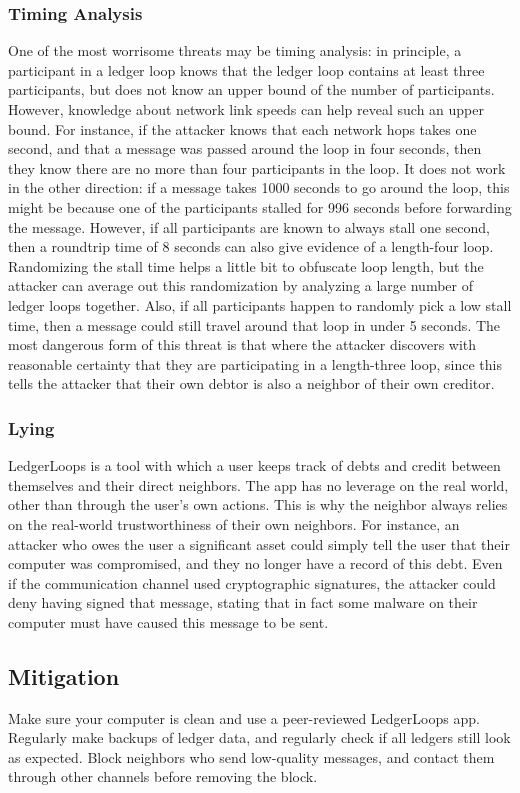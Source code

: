 \documentclass[11pt,twoside,a4paper]{article}
\begin{document}
\subsubsection{Timing Analysis}
One of the most worrisome threats may be timing analysis: in principle, a participant in a ledger loop knows that the ledger loop contains at least three participants, but does not know an upper bound of the number of participants. However, knowledge about network link speeds can help reveal such an upper bound. For instance, if the attacker knows that each network hops takes one second, and that a message was passed around the loop in four seconds, then they know there are no more than four participants in the loop. It does not work in the other direction: if a message takes 1000 seconds to go around the loop, this might be because one of the participants stalled for 996 seconds before forwarding the message. However, if all participants are known to always stall one second, then a roundtrip time of 8 seconds can also give evidence of a length-four loop. Randomizing the stall time helps a little bit to obfuscate loop length, but the attacker can average out this randomization by analyzing a large number of ledger loops together. Also, if all participants happen to randomly pick a low stall time, then a message could still travel around that loop in under 5 seconds. The most dangerous form of this threat is that where the attacker discovers with reasonable certainty that they are participating in a length-three loop, since this tells the attacker that their own debtor is also a neighbor of their own creditor.

\subsubsection{Lying}
LedgerLoops is a tool with which a user keeps track of debts and credit between themselves and their direct neighbors. The app has no leverage on the real world, other than through the user's own actions. This is why the neighbor always relies on the real-world trustworthiness of their own neighbors. For instance, an attacker who owes the user a significant asset could simply tell the user that their computer was compromised, and they no longer have a record of this debt. Even if the communication channel used cryptographic signatures, the attacker could deny having signed that message, stating that in fact some malware on their computer must have caused this message to be sent.

\subsection{Mitigation}
Make sure your computer is clean and use a peer-reviewed LedgerLoops app. Regularly make backups of ledger data, and regularly check if all ledgers still look as expected. Block neighbors who send low-quality messages, and contact them through other channels before removing the block.
\end{document}
